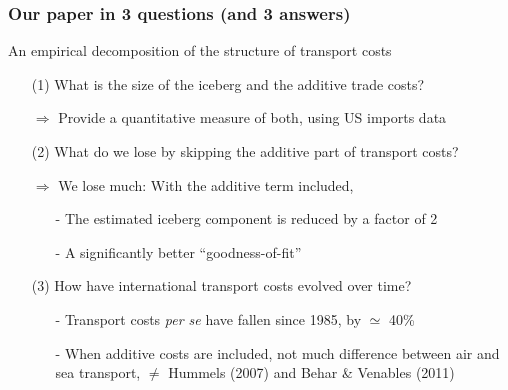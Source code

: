 \documentclass[10 pt,Helvetica, french]{beamer}
\begin{document}
\begin{frame}
\frametitle{Our paper in 3 questions (and 3 answers)}
An empirical decomposition of the structure of transport costs \vspace{0.1cm}
\begin{itemize}
\item[(1)] What is the size of the iceberg and the additive trade costs? \vspace{0.1cm}
\item[$\Rightarrow$] Provide a quantitative measure of both, using US imports data \vspace{0.1cm}
\item[(2)] What do we lose by skipping the additive part of transport costs? \vspace{0.1cm}
\item[$\Rightarrow$] We lose much: With the additive term included, \vspace{0.1cm}
\begin{itemize}
\item[-] The estimated iceberg component is reduced by a factor of 2 \vspace{0.1cm}
\item[-] A significantly better ``goodness-of-fit'' \vspace{0.1cm}
\end{itemize}
\item[(3)] How have international transport costs evolved over time? \vspace{0.1cm}
\begin{itemize}
\item[-] Transport costs \textit{per se} have fallen since 1985, by $\simeq$ 40\% \vspace{0.1cm}
\item[-] When additive costs are included, not much difference between air and sea transport, $\neq$ Hummels (2007) and Behar \& Venables (2011) \vspace{0.1cm}
\end{itemize}
\end{itemize}
\end{frame}
\end{document}
